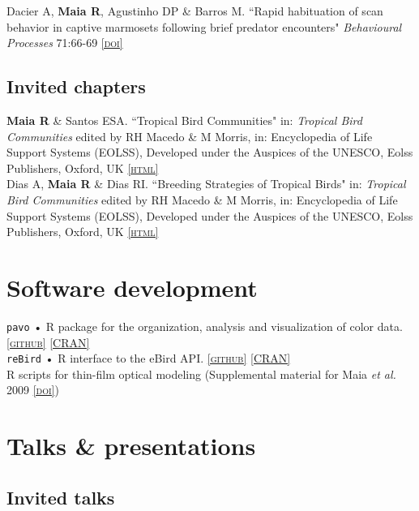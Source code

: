 \documentclass[10pt]{article}
\newcommand{\html}[1]{\href{#1}{\scriptsize\textsc{[html]}}}
\newcommand{\github}[1]{\href{#1}{\scriptsize\textsc{[github]}}}
\newcommand{\CRAN}[1]{\href{#1}{\scriptsize\textsc{[CRAN]}}}
\newcommand{\doi}[1]{\href{http://dx.doi.org/#1}{\scriptsize\textsc{[doi]}}}
\newcommand{\years}[1]{\marginnote{\raggedleft\scriptsize #1}}
\begin{document}
\years{2006} Dacier A,  \textbf{Maia R}, Agustinho DP \& Barros M. “Rapid habituation of scan behavior in captive marmosets following brief predator encounters" \emph{Behavioural Processes} 71:66-69 \doi{10.1016/j.beproc.2005.09.006}

\subsection*{Invited chapters}
\years{2008}  \textbf{Maia R} \& Santos ESA. “Tropical Bird Communities" in: \emph{Tropical Bird Communities} edited by RH Macedo \& M Morris, in: Encyclopedia of Life Support Systems (EOLSS), Developed under the Auspices of the UNESCO, Eolss Publishers, Oxford, UK \html{http://www.eolss.net/}\\

\years{} Dias A,  \textbf{Maia R} \& Dias RI. “Breeding Strategies of Tropical Birds" in: \emph{Tropical Bird Communities} edited by RH Macedo \& M Morris, in: Encyclopedia of Life Support Systems (EOLSS), Developed under the Auspices of the UNESCO, Eolss Publishers, Oxford, UK \html{http://www.eolss.net/}\\


\section*{Software development}
\texttt{pavo} • R package for the organization, analysis and visualization of color data. \github{https://github.com/rmaia/pavo}  \CRAN{http://cran.r-project.org/web/packages/pavo/index.html}\\
\texttt{reBird} • R interface to the eBird API. \github{https://github.com/ropensci/rebird}  \CRAN{http://cran.r-project.org/web/packages/rebird/index.html}\\
R scripts for thin-film optical modeling (Supplemental material for Maia \emph{et al.} 2009  \doi{10.1098/rsif.2008.0460.focus})\\


\section*{Talks \& presentations}

\subsection*{Invited talks}
\end{document}
